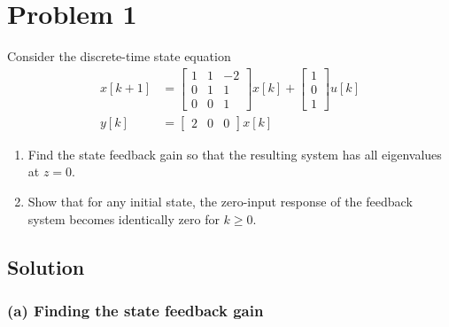 \section*{Problem 1}

Consider the discrete-time state equation
\begin{align*}
    x[k+1]
     & =
    \begin{bmatrix}
        1 & 1 & -2 \\
        0 & 1 & 1  \\
        0 & 0 & 1
    \end{bmatrix}
    x[k] +
    \begin{bmatrix}
        1 \\
        0 \\
        1
    \end{bmatrix}
    u[k]
    \\
    y[k]
     & =
    \begin{bmatrix}
        2 & 0 & 0
    \end{bmatrix}
    x[k]
\end{align*}
\begin{enumerate}[label= (\alph*)]
    \item Find the state feedback gain so that the resulting system has all eigenvalues at \( z=0 \).
    \item Show that for any initial state, the zero-input response of the feedback system becomes identically zero for \( k \geq 0 \).
\end{enumerate}

\subsection*{Solution}

\subsubsection*{(a) Finding the state feedback gain}

